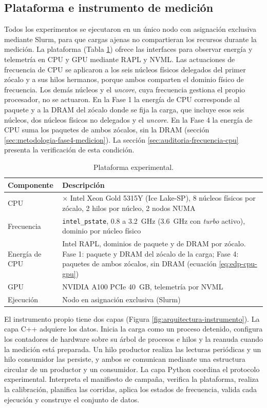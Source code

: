\subsection{Plataforma e instrumento de medición}

Todos los experimentos se ejecutaron en un único nodo con asignación exclusiva mediante Slurm, para que cargas ajenas no compartieran los recursos durante la medición. La plataforma (Tabla \ref{tab:met-plataforma}) ofrece las interfaces para observar energía y telemetría en CPU y GPU mediante RAPL y NVML. Las actuaciones de frecuencia de CPU se aplicaron a los seis núcleos físicos delegados del primer zócalo y a sus hilos hermanos, porque ambos comparten el dominio físico de frecuencia. Los demás núcleos y el \textit{uncore}, cuya frecuencia gestiona el propio procesador, no se actuaron. En la Fase 1 la energía de CPU corresponde al paquete y a la DRAM del zócalo donde se fija la carga, que incluye esos seis núcleos, dos núcleos físicos no delegados y el \textit{uncore}. En la Fase 4 la energía de CPU suma los paquetes de ambos zócalos, sin la DRAM (sección \ref{sec:metodologia-fase4-medicion}). La sección \ref{sec:auditoria-frecuencia-cpu} presenta la verificación de esta condición.

\begin{table}[H]
\centering
\caption{Plataforma experimental.}
\label{tab:met-plataforma}
\small
\begin{tabular}{@{}>{\raggedright\arraybackslash}p{4.2cm}>{\raggedright\arraybackslash}p{9.6cm}@{}}
\toprule
\textbf{Componente} & \textbf{Descripción} \\
\midrule
CPU & 2 $\times$ Intel Xeon Gold 5315Y (Ice Lake-SP), 8 núcleos físicos por zócalo, 2 hilos por núcleo, 2 nodos NUMA \\
Frecuencia & \texttt{intel\_pstate}, 0.8 a 3.2~GHz (3.6~GHz con \textit{turbo} activo), dominio por núcleo físico \\
Energía de CPU & Intel RAPL, dominios de paquete y de DRAM por zócalo. Fase 1: paquete y DRAM del zócalo de la carga; Fase 4: paquetes de ambos zócalos, sin DRAM (ecuación \eqref{eq:edp-cpu-gpu}) \\
GPU & NVIDIA A100 PCIe 40~GB, telemetría por NVML \\
Ejecución & Nodo en asignación exclusiva (Slurm) \\
\bottomrule
\end{tabular}
\end{table}

El instrumento propio tiene dos capas (Figura \ref{fig:arquitectura-instrumento}). La capa C++ adquiere los datos. Inicia la carga como un proceso detenido, configura los contadores de hardware sobre su árbol de procesos e hilos y la reanuda cuando la medición está preparada. Un hilo productor realiza las lecturas periódicas y un hilo consumidor las persiste, y ambos se comunican mediante una estructura circular de un productor y un consumidor. La capa Python coordina el protocolo experimental. Interpreta el manifiesto de campaña, verifica la plataforma, realiza la calibración, planifica las corridas, aplica los estados de frecuencia, valida cada ejecución y construye el conjunto de datos.

